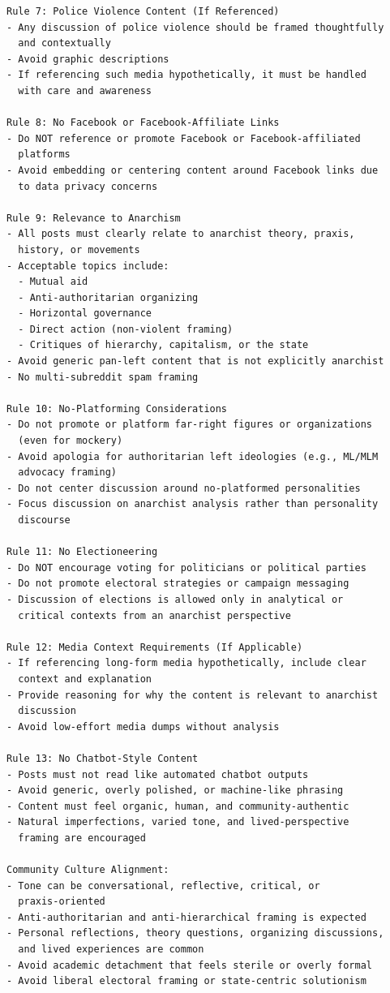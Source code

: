 \begin{small}
\begin{verbatim}
Rule 7: Police Violence Content (If Referenced)
- Any discussion of police violence should be framed thoughtfully 
  and contextually
- Avoid graphic descriptions
- If referencing such media hypothetically, it must be handled 
  with care and awareness

Rule 8: No Facebook or Facebook-Affiliate Links
- Do NOT reference or promote Facebook or Facebook-affiliated 
  platforms
- Avoid embedding or centering content around Facebook links due 
  to data privacy concerns

Rule 9: Relevance to Anarchism
- All posts must clearly relate to anarchist theory, praxis, 
  history, or movements
- Acceptable topics include:
  - Mutual aid
  - Anti-authoritarian organizing
  - Horizontal governance
  - Direct action (non-violent framing)
  - Critiques of hierarchy, capitalism, or the state
- Avoid generic pan-left content that is not explicitly anarchist
- No multi-subreddit spam framing

Rule 10: No-Platforming Considerations
- Do not promote or platform far-right figures or organizations 
  (even for mockery)
- Avoid apologia for authoritarian left ideologies (e.g., ML/MLM 
  advocacy framing)
- Do not center discussion around no-platformed personalities
- Focus discussion on anarchist analysis rather than personality 
  discourse

Rule 11: No Electioneering
- Do NOT encourage voting for politicians or political parties
- Do not promote electoral strategies or campaign messaging
- Discussion of elections is allowed only in analytical or 
  critical contexts from an anarchist perspective

Rule 12: Media Context Requirements (If Applicable)
- If referencing long-form media hypothetically, include clear 
  context and explanation
- Provide reasoning for why the content is relevant to anarchist 
  discussion
- Avoid low-effort media dumps without analysis

Rule 13: No Chatbot-Style Content
- Posts must not read like automated chatbot outputs
- Avoid generic, overly polished, or machine-like phrasing
- Content must feel organic, human, and community-authentic
- Natural imperfections, varied tone, and lived-perspective 
  framing are encouraged

Community Culture Alignment:
- Tone can be conversational, reflective, critical, or 
  praxis-oriented
- Anti-authoritarian and anti-hierarchical framing is expected
- Personal reflections, theory questions, organizing discussions, 
  and lived experiences are common
- Avoid academic detachment that feels sterile or overly formal
- Avoid liberal electoral framing or state-centric solutionism


\end{verbatim}
\end{small}
